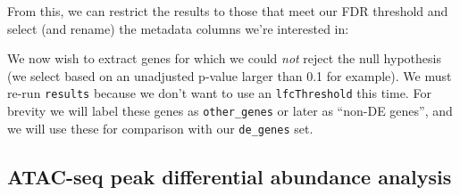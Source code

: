 \documentclass[
]{article}
\newenvironment{Shaded}{}{}
\newcommand{\DataTypeTok}[1]{\textcolor[rgb]{0.56,0.13,0.00}{#1}}
\newcommand{\FloatTok}[1]{\textcolor[rgb]{0.25,0.63,0.44}{#1}}
\newcommand{\KeywordTok}[1]{\textcolor[rgb]{0.00,0.44,0.13}{\textbf{#1}}}
\newcommand{\NormalTok}[1]{#1}
\newcommand{\OperatorTok}[1]{\textcolor[rgb]{0.40,0.40,0.40}{#1}}
\newcommand{\StringTok}[1]{\textcolor[rgb]{0.25,0.44,0.63}{#1}}
\begin{document}
From this, we can restrict the results to those that meet our FDR threshold and
select (and rename) the metadata columns we're interested in:

\begin{Shaded}
\end{Shaded}

We now wish to extract genes for which we could \emph{not} reject the null
hypothesis (we select based on an unadjusted p-value larger than 0.1 for
example). We must re-run \texttt{results} because we don't want to use an
\texttt{lfcThreshold} this time. For brevity we will label these genes as
\texttt{other\_genes} or later as ``non-DE genes'', and we will use these for comparison
with our \texttt{de\_genes} set.

\begin{Shaded}
\end{Shaded}

\hypertarget{atac-seq-peak-differential-abundance-analysis}{%
\subsection{ATAC-seq peak differential abundance analysis}\label{atac-seq-peak-differential-abundance-analysis}}
\end{document}
